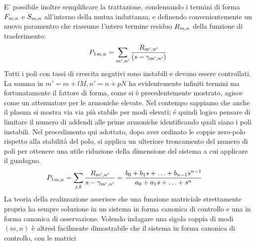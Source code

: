  E' possibile inoltre semplificare la trattazione, condensando i termini
di forma $F_{m,n}$ e $S_{m,n}$ all'interno della mutua induttanza, e definendo
convenientemente un nuovo paramentro che riassume l'intero termine
residuo $R_{m,n}$ \cite{gregoratto} della funzione di trasferimento:
\begin{equation}
 {P_1}_{m,n} = \sum_{m',n'} \frac{R_{m',n'}}{(s-\gamma_{m',n'})}
\end{equation}
Tutti i poli con tassi di crescita negativi sono instabili e devono
essere controllati.  La somma in $m' = m+lM, n'= n+pN$ ha evidentemente
infiniti termini ma fortunatamente il fattore di forma, come si è
precedentemente mostrato, agisce come un attenuatore per le armoniche
elevate.  Nel contempo sappiamo che anche il plasma si mostra via via
più stabile per modi elevati; é quindi logico pensare di limitare il
numero di addendi alle prime armoniche identificando quali siano i poli
instabili.  Nel procedimento qui adottato, dopo aver ordinato le coppie
zero-polo rispetto alla stabilità del polo, si applica un ulteriore
troncamento del numero di poli per ottenere una utile riduzione della
dimensione del sistema a cui applicare il guadagno.
\begin{align}
 \label{eq:trasferimento}
 {P_1}_{m,n} &= \sum_{j,k} \frac{R_{m',n'}}{s-\gamma_{m',n'}} =
 \frac{b_0+b_1s+\hdots+b_{n-1}s^{n-1}}{a_0+a_1s+\hdots+s^n}
\end{align}
La teoria della realizzazione asserisce che una funzione matriciale
strettamente propria ha sempre soluzione in un sistema in forma canonica
di controllo e una in forma canonica di osservazione.  Volendo indagare
una sigola coppia di modi $(m,n)$ è altresì facilmente dimostrabile che
il sistema in forma canonica di controllo, con le matrici
\newcommand{\canonicalcontrolA}{ 
\left[
\begin{matrix}
 0 & 1 && \\
 &&\ddots \\ \\
 &&&1 \\
 -a_0 & -a_1 & \hdots & -a_{n-1}
\end{matrix}
\right]
}
\newcommand{\canonicalcontrolB}{ 
\left[
\begin{matrix}
0\\ 0\\ \vdots \\ \\ 1
\end{matrix}
\right]
}
\newcommand{\canonicalcontrolC}{ 
\left[
\begin{matrix}
B_0& b_1& \hdots & & b_{n-1}
\end{matrix}
\right]
}
